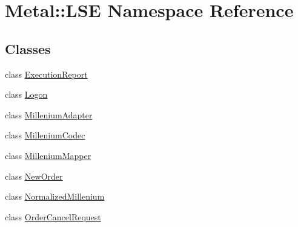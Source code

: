 \hypertarget{namespaceMetal_1_1LSE}{}\section{Metal\+:\+:L\+S\+E Namespace Reference}
\label{namespaceMetal_1_1LSE}
\subsection*{Classes}
\begin{DoxyCompactItemize}
\item 
class \hyperlink{classMetal_1_1LSE_1_1ExecutionReport}{Execution\+Report}
\item 
class \hyperlink{classMetal_1_1LSE_1_1Logon}{Logon}
\item 
class \hyperlink{classMetal_1_1LSE_1_1MilleniumAdapter}{Millenium\+Adapter}
\item 
class \hyperlink{classMetal_1_1LSE_1_1MilleniumCodec}{Millenium\+Codec}
\item 
class \hyperlink{classMetal_1_1LSE_1_1MilleniumMapper}{Millenium\+Mapper}
\item 
class \hyperlink{classMetal_1_1LSE_1_1NewOrder}{New\+Order}
\item 
class \hyperlink{classMetal_1_1LSE_1_1NormalizedMillenium}{Normalized\+Millenium}
\item 
class \hyperlink{classMetal_1_1LSE_1_1OrderCancelRequest}{Order\+Cancel\+Request}
\end{DoxyCompactItemize}
